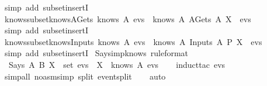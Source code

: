 \begin{isabellebody}
  \isatagproof
  \isamarkupfalse%
  \ {\isacharparenleft}simp\ add{\isacharcolon}\ subset{\isacharunderscore}insertI{\isacharparenright}%
  \endisatagproof
  {\isafoldproof}%
  \isadelimproof
  \isanewline
  \endisadelimproof
  \isanewline
  \isamarkupfalse%
  \ knows{\isacharunderscore}subset{\isacharunderscore}knows{\isacharunderscore}AGets{\isacharcolon}\ {\isachardoublequoteopen}knows\ A\ evs\ {\isasymsubseteq}\ knows\ A\ {\isacharparenleft}AGets\ A{\isacharprime}\ X\ {\isacharhash}\ evs{\isacharparenright}{\isachardoublequoteclose}\isanewline
  \isadelimproof
  \endisadelimproof
  \isatagproof
  \isamarkupfalse%
  \ {\isacharparenleft}simp\ add{\isacharcolon}\ subset{\isacharunderscore}insertI{\isacharparenright}%
  \endisatagproof
  {\isafoldproof}%
  \isadelimproof
  \isanewline
  \endisadelimproof
  \isanewline
  \isamarkupfalse%
  \ knows{\isacharunderscore}subset{\isacharunderscore}knows{\isacharunderscore}Inputs{\isacharcolon}\ {\isachardoublequoteopen}knows\ A\ evs\ {\isasymsubseteq}\ knows\ A\ {\isacharparenleft}Inputs\ A{\isacharprime}\ P\ X\ {\isacharhash}\ evs{\isacharparenright}{\isachardoublequoteclose}\isanewline
  \isadelimproof
  \endisadelimproof
  \isatagproof
  \isamarkupfalse%
  \ {\isacharparenleft}simp\ add{\isacharcolon}\ subset{\isacharunderscore}insertI{\isacharparenright}\isanewline
  \isanewline
  \endisatagproof
  {\isafoldproof}%
  \isadelimproof
  \isanewline
  \endisadelimproof
  \isamarkupfalse%
  \ Says{\isacharunderscore}imp{\isacharunderscore}knows\ {\isacharbrackleft}rule{\isacharunderscore}format{\isacharbrackright}\ {\isacharcolon}\isanewline
  \ \ {\isachardoublequoteopen}Says\ A\ B\ X\ {\isasymin}\ set\ evs\ {\isasymlongrightarrow}\ X\ {\isasymin}\ knows\ A\ evs{\isachardoublequoteclose}\isanewline
  \isadelimproof
  \ \ %
  \endisadelimproof
  \isatagproof
  \isamarkupfalse%
  \ {\isacharparenleft}induct{\isacharunderscore}tac\ {\isachardoublequoteopen}evs{\isachardoublequoteclose}{\isacharparenright}\isanewline
  \ \ \isamarkupfalse%
  \ {\isacharparenleft}simp{\isacharunderscore}all\ {\isacharparenleft}no{\isacharunderscore}asm{\isacharunderscore}simp{\isacharparenright}\ split{\isacharcolon}\ event{\isachardot}split{\isacharparenright}\isanewline
  \ \ \isamarkupfalse%
  \ {\isacharparenleft}auto{\isacharparenright}\isanewline
  \isamarkupfalse%

\end{isabellebody}
